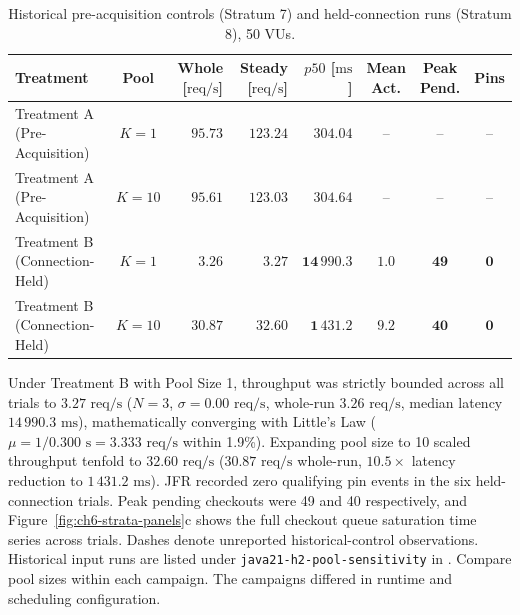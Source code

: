 \begin{table}[htbp]
  \centering
  \small
  \setlength{\tabcolsep}{3.5pt}
  \caption[Historical controls (Stratum~7) and held-connection runs (Stratum~8).]{Historical pre-acquisition controls (Stratum 7) and held-connection runs (Stratum 8), 50 VUs.}
  \label{tab:persistence-contention}
  \begin{tabularx}{\textwidth}{@{}>{\raggedright\arraybackslash}X c r r r c c c@{}}
    \toprule
    \textbf{Treatment} & \textbf{Pool} & \shortstack{\textbf{Whole}\\\textbf{[$\text{req/s}$]}} & \shortstack{\textbf{Steady}\\\textbf{[$\text{req/s}$]}} & \shortstack{\textbf{$p50$}\\\textbf{[$\text{ms}$]}} & \shortstack{\textbf{Mean}\\\textbf{Act.}} & \shortstack{\textbf{Peak}\\\textbf{Pend.}} & \textbf{Pins} \\
    \midrule
    Treatment A (Pre-Acquisition) & $K=1$ & $95.73$ & $123.24$ & $304.04$ & -- & -- & -- \\
    Treatment A (Pre-Acquisition) & $K=10$ & $95.61$ & $123.03$ & $304.64$ & -- & -- & -- \\
    \midrule
    Treatment B (Connection-Held) & $K=1$ & $3.26$ & $\mathbf{3.27}$ & $\mathbf{14\,990.3}$ & $1.0$ & $\mathbf{49}$ & $\mathbf{0}$ \\
    Treatment B (Connection-Held) & $K=10$ & $30.87$ & $\mathbf{32.60}$ & $\mathbf{1\,431.2}$ & $9.2$ & $\mathbf{40}$ & $\mathbf{0}$ \\
    \bottomrule
  \end{tabularx}
\end{table}

Under Treatment B with Pool Size 1, throughput was strictly bounded across all trials to \textbf{$3.27\text{ req/s}$} ($N=3$, $\sigma = 0.00\text{ req/s}$, whole-run $3.26\text{ req/s}$, median latency $14\,990.3\text{ ms}$), mathematically converging with Little's Law ($\mu = 1 / 0.300\text{ s} = 3.333\text{ req/s}$ within 1.9\%). Expanding pool size to 10 scaled throughput tenfold to \textbf{$32.60\text{ req/s}$} ($30.87\text{ req/s}$ whole-run, $10.5\times$ latency reduction to $1\,431.2\text{ ms}$). JFR recorded zero qualifying pin events in the six held-connection trials. Peak pending checkouts were 49 and 40 respectively, and Figure~\ref{fig:ch6-strata-panels}c shows the full checkout queue saturation time series across trials. Dashes denote unreported historical-control observations. Historical input runs are listed under \texttt{java21-h2-pool-sensitivity} in . Compare pool sizes within each campaign. The campaigns differed in runtime and scheduling configuration.

